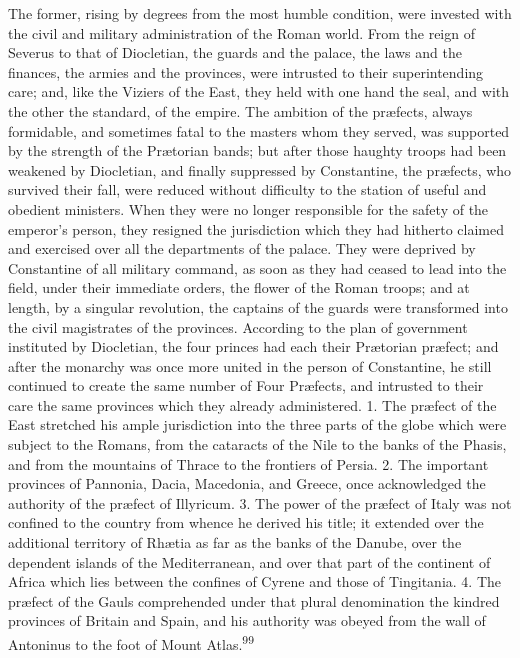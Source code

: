 The former, rising by degrees from the most humble condition,
were invested with the civil and military administration of the
Roman world. From the reign of Severus to that of Diocletian, the
guards and the palace, the laws and the finances, the armies and
the provinces, were intrusted to their superintending care; and,
like the Viziers of the East, they held with one hand the seal,
and with the other the standard, of the empire. The ambition of
the præfects, always formidable, and sometimes fatal to the
masters whom they served, was supported by the strength of the
Prætorian bands; but after those haughty troops had been weakened
by Diocletian, and finally suppressed by Constantine, the
præfects, who survived their fall, were reduced without
difficulty to the station of useful and obedient ministers. When
they were no longer responsible for the safety of the emperor’s
person, they resigned the jurisdiction which they had hitherto
claimed and exercised over all the departments of the palace.
They were deprived by Constantine of all military command, as
soon as they had ceased to lead into the field, under their
immediate orders, the flower of the Roman troops; and at length,
by a singular revolution, the captains of the guards were
transformed into the civil magistrates of the provinces.
According to the plan of government instituted by Diocletian, the
four princes had each their Prætorian præfect; and after the
monarchy was once more united in the person of Constantine, he
still continued to create the same number of Four Præfects, and
intrusted to their care the same provinces which they already
administered. 1. The præfect of the East stretched his ample
jurisdiction into the three parts of the globe which were subject
to the Romans, from the cataracts of the Nile to the banks of the
Phasis, and from the mountains of Thrace to the frontiers of
Persia. 2. The important provinces of Pannonia, Dacia, Macedonia,
and Greece, once acknowledged the authority of the præfect of
Illyricum. 3. The power of the præfect of Italy was not confined
to the country from whence he derived his title; it extended over
the additional territory of Rhætia as far as the banks of the
Danube, over the dependent islands of the Mediterranean, and over
that part of the continent of Africa which lies between the
confines of Cyrene and those of Tingitania. 4. The præfect of the
Gauls comprehended under that plural denomination the kindred
provinces of Britain and Spain, and his authority was obeyed from
the wall of Antoninus to the foot of Mount Atlas.\textsuperscript{99}

